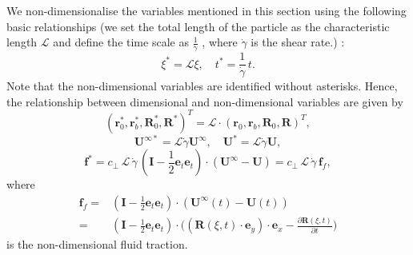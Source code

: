 \documentclass[a4paper,12pt]{report}
\begin{document}
We non-dimensionalise the variables mentioned in this section using the following basic relationships (we set the total length
of the particle as the characteristic length $\mathcal{L}$ and define the time scale as $\frac{1}{\dot{\gamma}}$ , where $\dot{\gamma}$ is the shear rate.) :
\begin{equation}
	\label{eqn:25}
	\xi^*=\mathcal{L}\xi, \quad t^*=\frac{1}{\dot{\gamma}}\,t.
\end{equation}
Note that the non-dimensional variables are identified without asterisks.
Hence, the relationship between dimensional and non-dimensional variables are given by
\begin{equation}
	\label{eqn:26}
	(\mathbf{r}_0^*, \mathbf{r}_b^*, \mathbf{R}_0^*, \mathbf{R}^*)^T=\mathcal{L}\cdot(\mathbf{r}_0, \mathbf{r}_b, \mathbf{R}_0, \mathbf{R})^T,
\end{equation}
\begin{equation}
	\label{eqn:27}
	\mathbf{U}^{\infty*}=\mathcal{L}\dot{\gamma}\mathbf{U}^{\infty}, \quad \mathbf{U}^*=\mathcal{L}\dot{\gamma}\mathbf{U},
\end{equation}
\begin{equation}
	\label{eqn:28}
	\mathbf{f}^*=c_\perp\,\mathcal{L}\,\dot{\gamma}\,\left(\mathbf{I}-\frac{1}{2}\mathbf{e}_t\mathbf{e}_t\right)\cdot(\mathbf{U}^{\infty}-\mathbf{U})=c_\perp\,\mathcal{L}\,\dot{\gamma}\,\mathbf{f}_{f},
\end{equation}
where 
\begin{equation}
	\label{eqn:101}
	\begin{aligned}
	\mathbf{f}_f=&\left(\mathbf{I}-\frac{1}{2}\mathbf{e}_t\mathbf{e}_t\right)\cdot(\mathbf{U}^{\infty}(t)-\mathbf{U}(t))\\
	=&\left(\mathbf{I}-\frac{1}{2}\mathbf{e}_t\mathbf{e}_t\right)\cdot\Big((\mathbf{\mathbf{R}}(\xi,t)\cdot\mathbf{e}_y)\cdot\mathbf{e}_x-\frac{\partial\mathbf{R}(\xi,t)}{\partial t}\Big)
	\end{aligned}
\end{equation}
is the non-dimensional fluid traction. 
\end{document}
